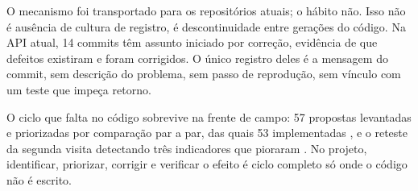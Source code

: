 O mecanismo foi transportado para os repositórios atuais; o hábito não. Isso não
é ausência de cultura de registro, é descontinuidade entre gerações do código. Na
API atual, 14 commits têm assunto iniciado por correção, evidência de que
defeitos existiram e foram corrigidos. O único registro deles é a mensagem do
commit, sem descrição do problema, sem passo de reprodução, sem vínculo com um
teste que impeça retorno.

O ciclo que falta no código sobrevive na frente de campo: 57 propostas levantadas
e priorizadas por comparação par a par, das quais 53 implementadas
\cite[p.~10]{psp5}, e o reteste da segunda visita detectando três indicadores que
pioraram \cite{dashboard}. No projeto, identificar, priorizar, corrigir e
verificar o efeito é ciclo completo só onde o código não é escrito.

